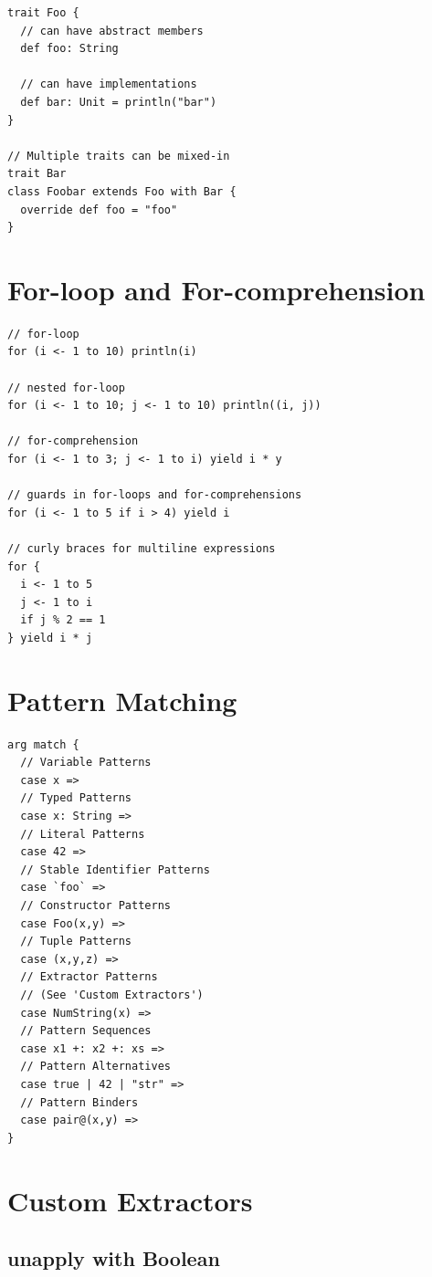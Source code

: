 \documentclass[10pt,landscape,a4paper]{article}
\begin{document}
\begin{multicols*}{4}
\begin{verbatim}
trait Foo {
  // can have abstract members
  def foo: String

  // can have implementations
  def bar: Unit = println("bar")
}

// Multiple traits can be mixed-in
trait Bar
class Foobar extends Foo with Bar {
  override def foo = "foo"
}
\end{verbatim}

  \section{For-loop and For-comprehension}

\begin{verbatim}
// for-loop
for (i <- 1 to 10) println(i)

// nested for-loop
for (i <- 1 to 10; j <- 1 to 10) println((i, j))

// for-comprehension
for (i <- 1 to 3; j <- 1 to i) yield i * y

// guards in for-loops and for-comprehensions
for (i <- 1 to 5 if i > 4) yield i

// curly braces for multiline expressions
for {
  i <- 1 to 5
  j <- 1 to i
  if j % 2 == 1
} yield i * j
\end{verbatim}
  \section{Pattern Matching}

\begin{verbatim}
arg match {
  // Variable Patterns
  case x =>
  // Typed Patterns
  case x: String =>
  // Literal Patterns
  case 42 =>
  // Stable Identifier Patterns
  case `foo` =>
  // Constructor Patterns
  case Foo(x,y) =>
  // Tuple Patterns
  case (x,y,z) =>
  // Extractor Patterns
  // (See 'Custom Extractors')
  case NumString(x) =>
  // Pattern Sequences
  case x1 +: x2 +: xs =>
  // Pattern Alternatives
  case true | 42 | "str" =>
  // Pattern Binders
  case pair@(x,y) =>
}
\end{verbatim}

  \section{Custom Extractors}

  \subsection{unapply with Boolean}


\end{multicols*}
\end{document}
